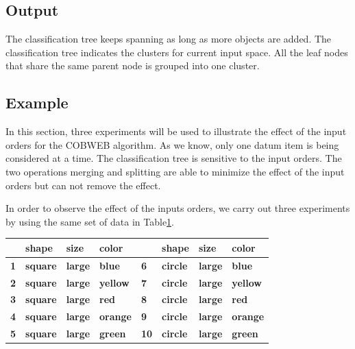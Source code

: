 \subsection {Output}
The classification tree keeps spanning as long as more objects are added. The classification tree indicates the clusters for current input space. All the leaf nodes that share the same parent node is grouped into one cluster.
\subsection {Example}
 In this section, three experiments will be used to illustrate the effect of the input orders for the COBWEB algorithm. As we know, only one datum item is being considered at a time. The classification tree is sensitive to the input orders\cite{fisher1987knowledge}. The two operations merging and splitting are able to minimize the effect of the input orders but can not remove the effect.
 
 In order to observe the effect of the inputs orders, we carry out three experiments by using the same set of data in Table\ref{tab:inputseq}.
 \begin{table}[!ht]
 {
 \centering
 \begin{tabular}{l l l l l l l l}\hline
 \textbf{} & \textbf{shape} & \textbf{size} & \textbf{color}   & \textbf{} & \textbf{shape} & \textbf{size} & \textbf{color}\\\hline
 \textbf{1} & \textbf{square} & \textbf{large} & \textbf{blue}   & \textbf{6} & \textbf{circle} & \textbf{large} & \textbf{blue}\\
 \textbf{2} & \textbf{square} & \textbf{large} & \textbf{yellow} & \textbf{7} & \textbf{circle} & \textbf{large} & \textbf{yellow}\\
 \textbf{3} & \textbf{square} & \textbf{large} & \textbf{red}    & \textbf{8} & \textbf{circle} & \textbf{large} & \textbf{red}\\
 \textbf{4} & \textbf{square} & \textbf{large} & \textbf{orange} & \textbf{9} & \textbf{circle} & \textbf{large} & \textbf{orange}\\
 \textbf{5} & \textbf{square} & \textbf{large} & \textbf{green}  & \textbf{10} & \textbf{circle} & \textbf{large} & \textbf{green}\\
 \hline
 \end{tabular}
 \label{tab:inputseq}}
 \end{table}
 
